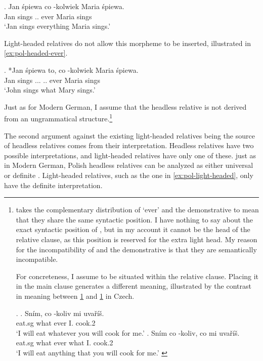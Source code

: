 \exg. Jan śpiewa co -kolwiek Maria śpiewa.\\
Jan sings .. ever Maria sings\\
`Jan sings everything Maria sings.' \label{ex:pol-headless-ever}

Light-headed relatives do not allow this morpheme to be inserted, illustrated in \ref{ex:pol-headed-ever}.

\exg. *Jan śpiewa to, co -kolwiek Maria śpiewa.\\
Jan sings ... .. ever Maria sings\\
`John sings what Mary sings.' \label{ex:pol-headed-ever}

Just as for Modern German, I assume that the headless relative is not derived from an ungrammatical structure.\footnote{
\citet{citko2004} takes the complementary distribution of  `ever' and the demonstrative to mean that they share the same syntactic position. I have nothing to say about the exact syntactic position of , but in my account it cannot be the head of the relative clause, as this position is reserved for the extra light head. My reason for the incompatibility of  and the demonstrative is that they are semantically incompatible.

For concreteness, I assume  to be situated within the relative clause. Placing it in the main clause generates a different meaning, illustrated by the contrast in meaning between \ref{ex:cz-wh-ever} and \ref{ex:cz-ever-wh} in Czech.

\ex.
\ag. Sním, co -koliv mi uvaříš.\\
 eat.sg what ever I. cook.2\\
 `I will eat whatever you will cook for me.'\label{ex:cz-wh-ever}
\bg. Sním co -koliv, co mi uvaříš.\\
 eat.sg what ever what I. cook.2\\
 `I will eat anything that you will cook for me.' \label{ex:cz-ever-wh}

\phantom{x}
}

The second argument against the existing light-headed relatives being the source of headless relatives comes from their interpretation. Headless relatives have two possible interpretations, and light-headed relatives have only one of these.
just as in Modern German, Polish headless relatives can be analyzed as either universal or definite .
Light-headed relatives, such as the one in \ref{ex:pol-light-headed}, only have the definite interpretation.

